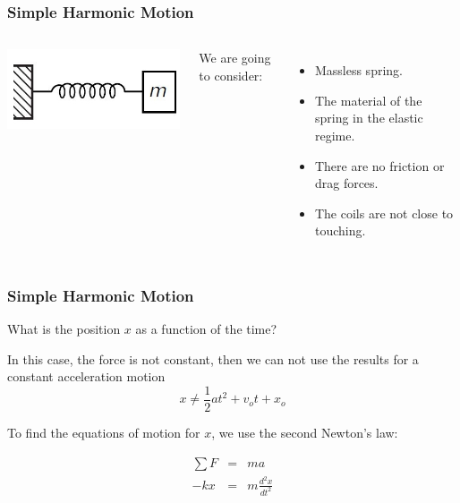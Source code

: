 \documentclass[]{beamer}
\begin{document}


\begin{frame}
  \frametitle{Simple Harmonic Motion}
  
  
  
    \begin{columns}[c]
     \column{2in}  %
    
    \begin{center}
    \includegraphics[height=1.in]{images3/spring0.jpg}
  \end{center}
  
     \column{2.4in}
 We are going to consider:
  
 \pause
  \begin{itemize}
  \item Massless spring.
  \pause
  \item The material of the spring in the elastic regime.
  \pause
  \item There are no friction or drag forces.
  \pause
  \item The coils are not close to touching.
  \end{itemize}
  
     \end{columns}
  
    \end{frame}

\begin{frame}
\frametitle{Simple Harmonic Motion}
What is the position $x$ as a function of the time?
\pause

\vspace{3mm}

In this case, the force is not constant, then  we can not use the results for a constant acceleration motion
\vspace{3mm}
\pause
\begin{equation*}
x\neq\frac{1}{2}at^2+v_ot+x_o
\end{equation*}  

To find the equations of motion for $x$, we use the second Newton's law:


\pause
\begin{eqnarray*}
\sum F&=&m a\\
-kx&=&m\frac{d^2x}{dt^2}\\
\end{eqnarray*} 

  \end{frame}
\end{document}
